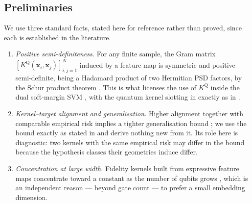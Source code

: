 %
%

\subsection{Preliminaries}

We use three standard facts, stated here for reference rather than proved,
since each is established in the literature.

\begin{enumerate}
  \item[\textbf{(F1)}] \emph{Positive semi-definiteness.} For any finite sample,
    the Gram matrix $[K^{\mathrm{Q}}(\bm{x}_i,\bm{x}_j)]_{i,j=1}^{N}$ induced by
    a feature map is symmetric and positive semi-definite, being a Hadamard
    product of two Hermitian PSD factors, by the Schur product
    theorem \cite{scholkopf2002}. This is what licenses the use of
    $K^{\mathrm{Q}}$ inside the dual soft-margin SVM
    \cite{cortes1995,scholkopf2002}, with the quantum kernel slotting in exactly
    as in \cite{havlicek2019,schuld2019}.
  \item[\textbf{(F2)}] \emph{Kernel--target alignment and generalisation.}
    Higher alignment together with comparable empirical risk implies a tighter
    generalisation bound \cite{cristianini2002,cortes2012}; we use the bound
    exactly as stated in \cite{cortes2012} and derive nothing new from it. Its
    role here is diagnostic: two kernels with the same empirical risk may differ
    in the bound because the hypothesis classes their geometries induce differ.
  \item[\textbf{(F3)}] \emph{Concentration at large width.} Fidelity kernels
    built from expressive feature maps concentrate toward a constant as the
    number of qubits grows \cite{thanasilp2024}, which is an independent reason
    --- beyond gate count --- to prefer a small embedding dimension.
\end{enumerate}

